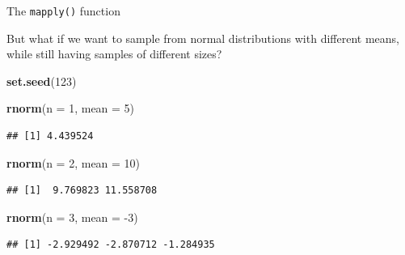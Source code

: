 \documentclass[ignorenonframetext,]{beamer}
\newenvironment{Shaded}{\begin{snugshade}}{\end{snugshade}}
\newcommand{\DataTypeTok}[1]{\textcolor[rgb]{0.13,0.29,0.53}{#1}}
\newcommand{\DecValTok}[1]{\textcolor[rgb]{0.00,0.00,0.81}{#1}}
\newcommand{\KeywordTok}[1]{\textcolor[rgb]{0.13,0.29,0.53}{\textbf{#1}}}
\newcommand{\NormalTok}[1]{#1}
\begin{document}
\begin{frame}[fragile]{The \texttt{mapply()} function}
\protect\hypertarget{the-mapply-function-4}{}

But what if we want to sample from normal distributions with different
means, while still having samples of different sizes?

\begin{Shaded}
\begin{Highlighting}[]
\KeywordTok{set.seed}\NormalTok{(}\DecValTok{123}\NormalTok{)}

\KeywordTok{rnorm}\NormalTok{(}\DataTypeTok{n =} \DecValTok{1}\NormalTok{, }\DataTypeTok{mean =} \DecValTok{5}\NormalTok{)}
\end{Highlighting}
\end{Shaded}

\begin{verbatim}
## [1] 4.439524
\end{verbatim}

\begin{Shaded}
\begin{Highlighting}[]
\KeywordTok{rnorm}\NormalTok{(}\DataTypeTok{n =} \DecValTok{2}\NormalTok{, }\DataTypeTok{mean =} \DecValTok{10}\NormalTok{)}
\end{Highlighting}
\end{Shaded}

\begin{verbatim}
## [1]  9.769823 11.558708
\end{verbatim}

\begin{Shaded}
\begin{Highlighting}[]
\KeywordTok{rnorm}\NormalTok{(}\DataTypeTok{n =} \DecValTok{3}\NormalTok{, }\DataTypeTok{mean =} \DecValTok{-3}\NormalTok{)}
\end{Highlighting}
\end{Shaded}

\begin{verbatim}
## [1] -2.929492 -2.870712 -1.284935
\end{verbatim}

\end{frame}
\end{document}
